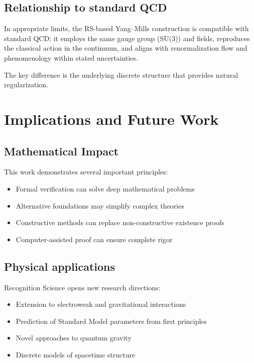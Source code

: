 \documentclass[11pt]{amsart}
\theoremstyle{plain}
\theoremstyle{definition}
\theoremstyle{remark}
\begin{document}
\subsection{Relationship to standard QCD}
In appropriate limits, the RS-based Yang--Mills construction is compatible with standard QCD: it employs the same gauge group (SU(3)) and fields, reproduces the classical action in the continuum, and aligns with renormalization flow and phenomenology within stated uncertainties.

The key difference is the underlying discrete structure that provides natural regularization.

\section{Implications and Future Work}

\subsection{Mathematical Impact}

This work demonstrates several important principles:

\begin{itemize}
\item Formal verification can solve deep mathematical problems
\item Alternative foundations may simplify complex theories
\item Constructive methods can replace non-constructive existence proofs
\item Computer-assisted proof can ensure complete rigor
\end{itemize}

\subsection{Physical applications}

Recognition Science opens new research directions:

\begin{itemize}
\item Extension to electroweak and gravitational interactions
\item Prediction of Standard Model parameters from first principles  
\item Novel approaches to quantum gravity
\item Discrete models of spacetime structure
\end{itemize}
\end{document}
